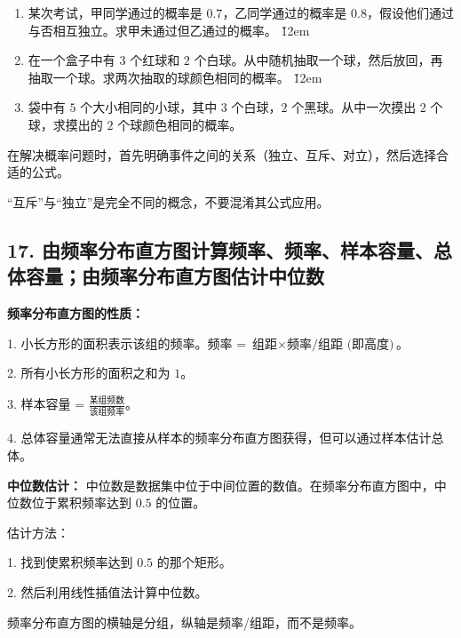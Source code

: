\begin{problem}
\begin{enumerate}
    \item 某次考试，甲同学通过的概率是 $0.7$，乙同学通过的概率是 $0.8$，假设他们通过与否相互独立。求甲未通过但乙通过的概率。
          \v{12em}
    \item 在一个盒子中有 $3$ 个红球和 $2$ 个白球。从中随机抽取一个球，然后放回，再抽取一个球。求两次抽取的球颜色相同的概率。
          \v{12em}
    \item 袋中有 $5$ 个大小相同的小球，其中 $3$ 个白球，$2$ 个黑球。从中一次摸出 $2$ 个球，求摸出的 $2$ 个球颜色相同的概率。
\end{enumerate}
\end{problem}
\begin{tips}
    在解决概率问题时，首先明确事件之间的关系（独立、互斥、对立），然后选择合适的公式。
\end{tips}
\begin{warning}
    “互斥”与“独立”是完全不同的概念，不要混淆其公式应用。
\end{warning}

\subsection*{17. 由频率分布直方图计算频率、频率、样本容量、总体容量；由频率分布直方图估计中位数}

\begin{theorem}
    \textbf{频率分布直方图的性质：}

    1. 小长方形的面积表示该组的频率。频率 = $\text{组距} \times \text{频率/组距 (即高度)}$。

    2. 所有小长方形的面积之和为 $1$。

    3. 样本容量 = $\frac{\text{某组频数}}{\text{该组频率}}$。

    4. 总体容量通常无法直接从样本的频率分布直方图获得，但可以通过样本估计总体。

    \textbf{中位数估计：} 中位数是数据集中位于中间位置的数值。在频率分布直方图中，中位数位于累积频率达到 $0.5$ 的位置。

    估计方法：

    1. 找到使累积频率达到 $0.5$ 的那个矩形。

    2. 然后利用线性插值法计算中位数。
\end{theorem}

\begin{warning}
    频率分布直方图的横轴是分组，纵轴是频率/组距，而不是频率。
\end{warning}

